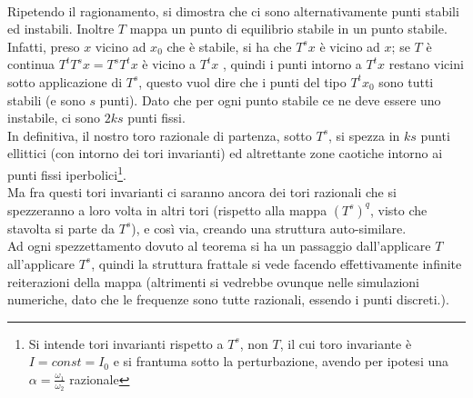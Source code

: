 \documentclass[a4paper,12pt]{article}
\theoremstyle{plain}
\theoremstyle{definition}
\newcommand{\f}[2]{\frac{#1}{#2}}
\theoremstyle{remark}
\begin{document}
\\Ripetendo il ragionamento, si dimostra che ci sono alternativamente punti stabili ed instabili. Inoltre $T$ mappa un punto di equilibrio stabile in un punto stabile. Infatti, preso $x$ vicino ad $x_0$ che è stabile, si ha che $T^s x$ è vicino ad $x$; se $T$ è continua $T^t T^s x=T^s T^t x$ è vicino a $T^t x$ , quindi i punti intorno a $T^t x$ restano vicini sotto applicazione di $T^s$, questo vuol dire che i punti del tipo $T^tx_0$ sono tutti stabili (e sono $s$ punti). Dato che per ogni punto stabile ce ne deve essere uno instabile, ci sono $2ks$ punti fissi.
\\ In definitiva, il nostro toro razionale di partenza, sotto $T^s$, si spezza in $ks$ punti ellittici (con intorno dei tori invarianti) ed altrettante zone caotiche intorno ai punti fissi iperbolici\footnote{Si intende tori invarianti rispetto a $T^s$, non  $T$, il cui toro invariante è $I=const=I_0$ e si frantuma sotto la perturbazione, avendo per ipotesi una $\alpha=\f{\omega_1}{\omega_2}$ razionale}.
\\Ma fra questi tori invarianti ci saranno ancora dei tori razionali che si spezzeranno a loro volta in altri tori (rispetto alla mappa $({T^s})^q$, visto che stavolta si parte da $T^s$), e così via, creando una struttura auto-similare.\\
Ad ogni spezzettamento dovuto al teorema si ha un passaggio dall'applicare $T$ all'applicare $T^s$, quindi la struttura frattale si vede facendo effettivamente infinite reiterazioni della mappa (altrimenti si vedrebbe ovunque nelle simulazioni numeriche, dato che le frequenze sono tutte razionali, essendo i punti discreti.).
\end{document}
